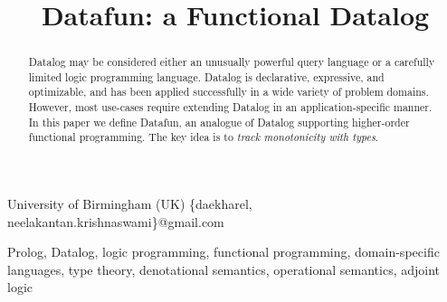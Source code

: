 \documentclass{sigplanconf}
\begin{document}
\toappear{}
\setlength{\pdfpageheight}{\paperheight}
\setlength{\pdfpagewidth}{\paperwidth}





\title{Datafun: a Functional Datalog}
\subtitle{}

           {University of Birmingham (UK)}
           {\{daekharel, neelakantan.krishnaswami\}@gmail.com}

\maketitle


\begin{abstract}
  Datalog may be considered either an unusually powerful query language or a
  carefully limited logic programming language. Datalog is declarative,
  expressive, and optimizable, and has been applied successfully in a wide
  variety of problem domains. However, most use-cases require extending Datalog
  in an application-specific manner. In this paper we define Datafun, an
  analogue of Datalog supporting higher-order functional programming. The key
  idea is to \emph{track monotonicity with types}.

\end{abstract}

%
%
\keywords Prolog, Datalog, logic programming, functional programming, domain-specific languages,
type theory, denotational semantics, operational semantics, adjoint
logic



\end{document}

